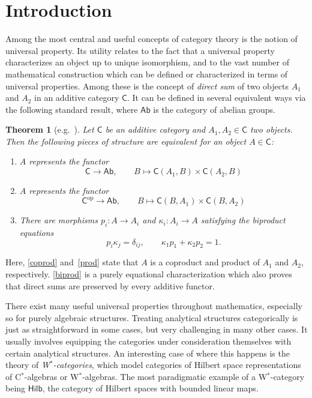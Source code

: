 \documentclass[reqno,T1,11pt]{amsproc}
\newcommand{\op}{\mathrm{op}}
\newcommand{\cat}[1]{\mathsf{#1}}		%
\newcommand{\Hilb}{\mathsf{Hilb}} 		%
\theoremstyle{plain}
\newtheorem{thm}{Theorem}[section]
\theoremstyle{remark}
\numberwithin{equation}{section}
\begin{document}
\section{Introduction}

Among the most central and useful concepts of category theory is the notion of universal property. Its utility relates to the fact that a universal property characterizes an object up to unique isomorphism, and to the vast number of mathematical construction which can be defined or characterized in terms of universal properties. Among these is the concept of \emph{direct sum} of two objects $A_1$ and $A_2$ in an additive category $\cat{C}$. It can be defined in several equivalent ways via the following standard result, where $\cat{Ab}$ is the category of abelian groups.

\begin{thm}[{e.g.~\cite[Proposition~1.2.4]{borceux}}]
\label{directsum_equiv_trad}
Let $\cat{C}$ be an additive category and $A_1,A_2\in\cat{C}$ two objects. Then the following pieces of structure are equivalent for an object $A\in\cat{C}$:
\begin{enumerate}
	\item\label{coprod} $A$ represents the functor
		\[
			\cat{C} \longrightarrow \cat{Ab}, \qquad B \longmapsto \cat{C}(A_1, B) \times \cat{C}(A_2, B)
		\]
    \item\label{prod} $A$ represents the functor
		\[
			\cat{C}^\op \longrightarrow \cat{Ab}, \qquad B \longmapsto \cat{C}(B, A_1) \times \cat{C}(B, A_2)
		\]
	\item\label{biprod} There are morphisms $p_i : A \to A_i$ and $\kappa_i : A_i \to A$ satisfying the \emph{biproduct equations}
	\[
		p_i \kappa_j = \delta_{ij}, \qquad \kappa_1 p_1 + \kappa_2 p_2 = 1.
	\]
\end{enumerate}
\end{thm}

Here, \ref{coprod} and~\ref{prod} state that $A$ is a coproduct and product of $A_1$ and $A_2$, respectively. \ref{biprod} is a purely equational characterization which also proves that direct sums are preserved by every additive functor.

There exist many useful universal properties throughout mathematics, especially so for purely
algebraic structures.  Treating analytical structures
categorically is just as straightforward in some cases, but very challenging
in many other cases. It usually involves equipping the categories
under consideration themselves with certain analytical structures.
An interesting case of where this happens is the theory of
\emph{W$^*$-categories}, which model categories of Hilbert space
representations of C$^*$-algebras or W$^*$-algebras. The most
paradigmatic example of a W$^*$-category being $\Hilb$, the category
of Hilbert spaces with bounded linear maps.
\end{document}
